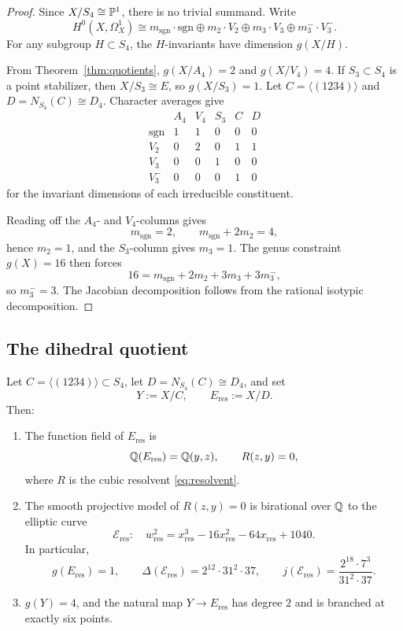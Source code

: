 \begin{proof}
Since \(X/S_4\cong \mathbb{P}^1\), there is no trivial summand. Write
\[
H^0(X,\Omega_X^1)\cong m_{\mathrm{sgn}}\cdot \mathrm{sgn}\oplus m_2\cdot V_2\oplus m_3\cdot V_3\oplus m_3^-\cdot V_3^-.
\]
For any subgroup \(H\subset S_4\), the \(H\)-invariants have dimension \(g(X/H)\).

From Theorem~\ref{thm:quotients}, \(g(X/A_4)=2\) and \(g(X/V_4)=4\). If \(S_3\subset S_4\) is a point stabilizer, then \(X/S_3\cong E\), so \(g(X/S_3)=1\). Let \(C=\langle(1234)\rangle\) and \(D=N_{S_4}(C)\cong D_4\). Character averages give
\[
\begin{array}{c|ccccc}
 & A_4 & V_4 & S_3 & C & D\\ \hline
\mathrm{sgn} & 1 & 1 & 0 & 0 & 0\\
V_2 & 0 & 2 & 0 & 1 & 1\\
V_3 & 0 & 0 & 1 & 0 & 0\\
V_3^- & 0 & 0 & 0 & 1 & 0
\end{array}
\]
for the invariant dimensions of each irreducible constituent.

Reading off the \(A_4\)- and \(V_4\)-columns gives
\[
m_{\mathrm{sgn}}=2,\qquad m_{\mathrm{sgn}}+2m_2=4,
\]
hence \(m_2=1\), and the \(S_3\)-column gives \(m_3=1\). The genus constraint \(g(X)=16\) then forces
\[
16=m_{\mathrm{sgn}}+2m_2+3m_3+3m_3^-,
\]
so \(m_3^-=3\). The Jacobian decomposition follows from the rational isotypic decomposition.
\end{proof}

\subsection{The dihedral quotient}

\begin{proposition}\label{prop:eres}
Let \(C=\langle(1234)\rangle\subset S_4\), let \(D=N_{S_4}(C)\cong D_4\), and set
\[
Y:=X/C,\qquad E_{\mathrm{res}}:=X/D.
\]
Then:
\begin{enumerate}
\item[(i)] The function field of \(E_{\mathrm{res}}\) is
\[
\mathbb{Q}(E_{\mathrm{res}})=\mathbb{Q}(y,z),\qquad R(z,y)=0,
\]
where \(R\) is the cubic resolvent \eqref{eq:resolvent}.
\item[(ii)] The smooth projective model of \(R(z,y)=0\) is birational over \(\mathbb{Q}\) to the elliptic curve
\[
 \mathcal E_{\mathrm{res}}:\quad w_{\mathrm{res}}^2=x_{\mathrm{res}}^3-16x_{\mathrm{res}}^2-64x_{\mathrm{res}}+1040.
\]
In particular,
\[
g(E_{\mathrm{res}})=1,\qquad
\Delta(\mathcal E_{\mathrm{res}})=2^{12}\cdot 31^2\cdot 37,\qquad
j(\mathcal E_{\mathrm{res}})=\frac{2^{18}\cdot 7^3}{31^2\cdot 37}.
\]
\item[(iii)] \(g(Y)=4\), and the natural map \(Y\to E_{\mathrm{res}}\) has degree \(2\) and is branched at exactly six points.
\end{enumerate}
\end{proposition}

